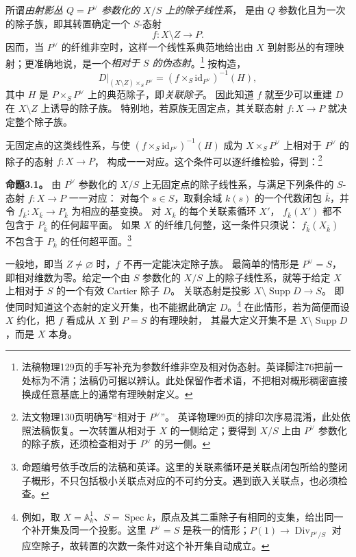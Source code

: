 \documentclass[openany,fontset=fandol]{ctexbook}
\DeclareMathOperator{\Div}{Div}
\DeclareMathOperator{\Supp}{Supp}
\DeclareMathOperator{\Spec}{Spec}
\begin{document}
所谓\emph{由射影丛 \(Q=P^\vee\) 参数化的 \(X/S\) 上的除子线性系}，
是由 \(Q\) 参数化且为一次的除子族，即其转置确定一个 \(S\)-态射
\[
 f:X\setminus Z\longrightarrow P.
\]
因而，当 \(P^\vee\) 的纤维非空时，这样一个线性系典范地给出由 \(X\) 到射影丛的有理映射；更准确地说，是一个\emph{相对于 \(S\) 的伪态射}。\footnote{法稿物理129页的手写补充为参数纤维非空及相对伪态射。英译脚注76把前一处标为不清；法稿仍可据以辨认。此处保留作者术语，不把相对概形稠密直接换成任意基底上的通常有理映射定义。}
按构造，
\[
 D\big|_{(X\setminus Z)\times_S P^\vee}
 =
 (f\times_S\mathrm{id}_{P^\vee})^{-1}(H),
\]
其中 \(H\) 是 \(P\times_S P^\vee\) 上的典范除子，即\emph{关联除子}。
因此知道 \(f\) 就至少可以重建 \(D\) 在 \(X\setminus Z\) 上诱导的除子族。
特别地，若原族无固定点，其关联态射 \(f:X\to P\) 就决定整个除子族。

无固定点的这类线性系，与使
\((f\times_S\mathrm{id}_{P^\vee})^{-1}(H)\)
成为 \(X\times_S P^\vee\) 上相对于 \(P^\vee\) 的除子的态射 \(f:X\to P\)，
构成一一对应。这个条件可以逐纤维检验，得到：\footnote{法文物理130页明确写“相对于 \(P^\vee\)”。
英译物理99页的排印次序易混淆，此处依照法稿恢复。一次转置从相对于 \(X\) 的一侧给定；要得到 \(X/S\) 上由 \(P^\vee\) 参数化的除子族，还须检查相对于 \(P^\vee\) 的另一侧。}

\medskip\noindent\textbf{命题3.1。}
由 \(P^\vee\) 参数化的 \(X/S\) 上无固定点的除子线性系，与满足下列条件的 \(S\)-态射 \(f:X\to P\) 一一对应：
对每个 \(s\in S\)，取剩余域 \(k(s)\) 的一个代数闭包 \(\bar k\)，并令 \(f_{\bar k}:X_{\bar k}\to P_{\bar k}\) 为相应的基变换。
对 \(X_{\bar k}\) 的每个关联素循环 \(X'\)，
\(f_{\bar k}(X')\) 都不包含于 \(P_{\bar k}\) 的任何超平面。
如果 \(X\) 的纤维几何整，这一条件只须说：
\(f_{\bar k}(X_{\bar k})\) 不包含于 \(P_{\bar k}\) 的任何超平面。\footnote{命题编号依手改后的法稿和英译。这里的关联素循环是关联点闭包所给的整闭子概形，不只包括极小关联点对应的不可约分支。遇到嵌入关联点，也必须检查。}

一般地，即当 \(Z\ne\varnothing\) 时，\(f\) 不再一定能决定除子族。
最简单的情形是 \(P^\vee=S\)，即相对维数为零。给定一个由 \(S\) 参数化的
\(X/S\) 上的除子线性系，就等于给定 \(X\) 上相对于 \(S\) 的一个有效 Cartier 除子 \(D\)。
关联态射是投影 \(X\setminus\Supp D\to S\)。
即使同时知道这个态射的定义开集，也不能据此确定 \(D\)。\footnote{例如，取 \(X=\mathbb A^1_k\)、\(S=\Spec k\)，原点及其二重除子有相同的支集，给出同一个补开集及同一个投影。这里 \(P^\vee=S\) 是秩一的情形；\(P(1)\to\Div_{P^\vee/S}\) 对应空除子，故转置的次数一条件对这个补开集自动成立。}
在此情形，若为简便而设 \(X\) 约化，把 \(f\) 看成从 \(X\) 到 \(P=S\) 的有理映射，
其最大定义开集不是 \(X\setminus\Supp D\)，而是 \(X\) 本身。
\end{document}
